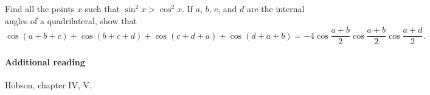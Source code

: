 \documentclass[answers]{exam}
\begin{document}
\begin{questions}
  \question Find all the points $ x $ such that $ \sin^2 x > \cos^2 x $.
  \question If $ a $, $ b $, $ c $, and $ d $ are the internal angles of a quadrilateral,
            show that
            \begin{displaymath}
              \cos (a+b+c) + \cos(b+c+d) + \cos(c+d+a) + \cos(d+a+b) = -4\cos \frac{a + b}{2} \cos \frac{a + b}{2} \cos \frac{a + d}{2}.
            \end{displaymath}
\end{questions}

\paragraph{Additional reading} Hobson, chapter IV, V.
\end{document}
